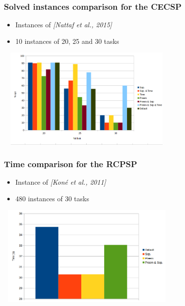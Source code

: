 \begin{frame}
\frametitle{Solved instances comparison for the CECSP}
\begin{itemize}
\item Instances of {\color{gray!50!black!70}\it [Nattaf et al., 2015]}
\item 10 instances of 20, 25 and 30 tasks
\end{itemize}
\vfill
\begin{center}
\includegraphics[height=5cm, width=9cm]{opt_CECSP.png}
\end{center}
\end{frame}

\begin{frame}
\frametitle{Time comparison for the RCPSP}
\begin{itemize}
\item Instance of {\color{gray!50!black!70} \it [Koné et al., 2011]}
\item 480 instances of 30 tasks
\end{itemize}
\vfill
\begin{center}
\includegraphics[height=5cm, width=9cm]{timeRCPSP.png}
\end{center}
\end{frame}

